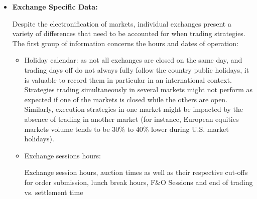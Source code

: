 \begin{itemize}
Maintaining a table of the quotation currency per instrument is also necessary in order to be able to aggregate positions at a portfolio level. Some exchanges allow the quotation of prices in currencies different from the one of the country in which the exchange is located \footnote{For example, Jardine Matheson Holdings quotes in USD on the Singapore exchange while most of the other securities quote in Singapore Dollars.}. Additionally, the Quote Factor associated with the quotation currency time series needs to be stored. To account for the wide range of currency values and preserve pricing precision, market data providers might be publishing FX rates with a factor of 100 or 1000. Hence, to convert prices to USD one needs to multiply by the quote factor: $usd price = local price * fx * quote factor$. Similarly, some exchanges quote prices in cents, and the associated quotation currency is reflected with a small cap letter: GBP/GBp, ZAR/ZAr, ILS/ILs, ...).

\item \textbf{Exchange Specific Data:}  

Despite the electronification of markets, individual exchanges present a variety of differences that need to be accounted for when trading strategies. The first group of information concerns the hours and dates of operation:

\begin{itemize}
\item Holiday calendar: as not all exchanges are closed on the same day, and trading days off do not always fully follow the country public holidays, it is valuable to record them in particular in an international context. Strategies trading simultaneously in several markets might not perform as expected if one of the markets is closed while the others are open. Similarly, execution strategies in one market might be impacted by the absence of trading in another market (for instance, European equities markets volume tends to be 30\% to 40\% lower during U.S. market holidays).
\item Exchange sessions hours: 

Exchange session hours, auction times as well as their respective cut-offs for order submission, lunch break hours, 
F\&O Sessions and end of trading vs. settlement time


\end{itemize}
\end{itemize}
